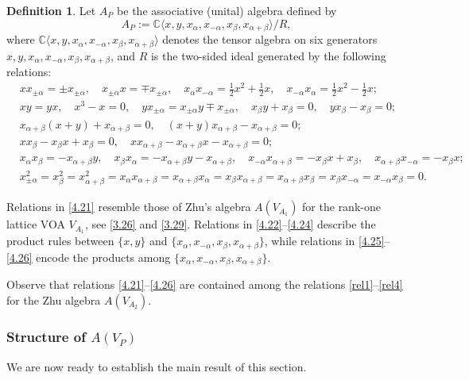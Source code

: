 \documentclass[12pt,a4paper,reqno]{amsart}
\numberwithin{equation}{section}
\numberwithin{equation}{section}
\theoremstyle{definition}
\newtheorem{df}[thm]{Definition}
\def \C {\mathbb{C}}
\def\<{\langle}
\def\>{\rangle}
\begin{document}
	\begin{df}\label{def:relations}
		Let $A_P$ be the associative (unital) algebra defined by 
		\[
		A_P:=\C\<x,y,x_\alpha,x_{-\alpha},x_\beta,x_{\alpha+\beta}\>/R,
		\]
		where $\C\<x,y,x_\alpha,x_{-\alpha},x_\beta,x_{\alpha+\beta}\>$ denotes the tensor algebra on six generators 
		$x,y,x_\alpha,x_{-\alpha},x_\beta,x_{\alpha+\beta}$, 
		and $R$ is the two-sided ideal generated by the following relations:
		\begin{align}
			&xx_{\pm\alpha}=\pm x_{\pm\alpha},\quad 
			x_{\pm\alpha}x=\mp x_{\pm\alpha},\quad 
			x_\alpha x_{-\alpha}=\tfrac{1}{2}x^2+\tfrac{1}{2}x,\quad 
			x_{-\alpha}x_\alpha=\tfrac{1}{2}x^2-\tfrac{1}{2}x; \label{4.21}\\[4pt]
			&xy=yx,\quad 
			x^3-x=0,\quad 
			yx_{\pm\alpha}=x_{\pm\alpha}y\mp x_{\pm\alpha},\quad 
			x_\beta y+x_\beta=0,\quad 
			yx_\beta-x_\beta=0; \label{4.22}\\[4pt]
			&x_{\alpha+\beta}(x+y)+x_{\alpha+\beta}=0,\quad 
			(x+y)x_{\alpha+\beta}-x_{\alpha+\beta}=0; \label{4.23}\\[4pt]
			&xx_\beta-x_\beta x+x_\beta=0,\quad 
			xx_{\alpha+\beta}-x_{\alpha+\beta}x-x_{\alpha+\beta}=0; \label{4.24}\\[4pt]
			&x_\alpha x_\beta=-x_{\alpha+\beta}y,\quad 
			x_\beta x_\alpha=-x_{\alpha+\beta}y-x_{\alpha+\beta},\quad 
			x_{-\alpha}x_{\alpha+\beta}=-x_\beta x+x_\beta,\quad 
			x_{\alpha+\beta}x_{-\alpha}=-x_\beta x; \label{4.25}\\[4pt]
			&x_{\pm\alpha}^2=x_\beta^2=x_{\alpha+\beta}^2
			=x_\alpha x_{\alpha+\beta}=x_{\alpha+\beta}x_\alpha
			=x_\beta x_{\alpha+\beta}=x_{\alpha+\beta}x_\beta
			=x_\beta x_{-\alpha}=x_{-\alpha}x_\beta=0. \label{4.26}
		\end{align}
	\end{df}
	
	\noindent
	Relations in \eqref{4.21} resemble those of Zhu’s algebra $A(V_{A_1})$ for the rank-one lattice VOA $V_{A_1}$, 
	see \eqref{3.26} and \eqref{3.29}.  
	Relations in \eqref{4.22}–\eqref{4.24} describe the product rules between $\{x,y\}$ and 
	$\{x_\alpha,x_{-\alpha},x_\beta,x_{\alpha+\beta}\}$, while 
	relations in \eqref{4.25}–\eqref{4.26} encode the products among $\{x_\alpha,x_{-\alpha},x_\beta,x_{\alpha+\beta}\}$.
	
	Observe that relations \eqref{4.21}--\eqref{4.26} are contained among the relations 
	\eqref{rel1}--\eqref{rel4} for the Zhu algebra $A(V_{A_2})$. 
	
	\subsubsection{Structure of $A(V_P)$}
	We are now ready to establish the main result of this section.
	
\end{document}
